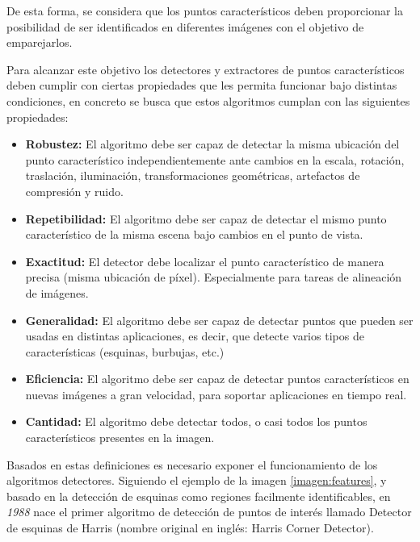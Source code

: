 De esta forma, se considera que los puntos característicos deben proporcionar la posibilidad de ser identificados en diferentes imágenes con el objetivo de emparejarlos.

Para alcanzar este objetivo los detectores y extractores de puntos característicos deben cumplir con ciertas propiedades que les permita funcionar bajo distintas condiciones, en concreto se busca que estos algoritmos cumplan con las siguientes propiedades:

\begin{itemize}
	\item \textbf{Robustez:} El algoritmo debe ser capaz de detectar la misma ubicación del punto característico independientemente ante cambios en la escala, rotación, traslación, iluminación, transformaciones geométricas, artefactos de compresión y ruido.
	
	\item \textbf{Repetibilidad:} El algoritmo debe ser capaz de detectar el mismo punto característico de la misma escena bajo cambios en el punto de vista.
	
	\item \textbf{Exactitud:} El detector debe localizar el punto característico de manera precisa (misma ubicación de píxel). Especialmente para tareas de alineación de imágenes.
	
	\item \textbf{Generalidad:} El algoritmo debe ser capaz de detectar puntos que pueden ser usadas en distintas aplicaciones, es decir, que detecte varios tipos de características (esquinas, burbujas, etc.)
	
	\item \textbf{Eficiencia:} El algoritmo debe ser capaz de detectar puntos característicos en nuevas imágenes a gran velocidad, para soportar aplicaciones en tiempo real.
	
	\item \textbf{Cantidad:} El algoritmo debe detectar todos, o casi todos los puntos característicos presentes en la imagen. 
	
\end{itemize}





Basados en estas definiciones es necesario exponer el funcionamiento de los algoritmos detectores.  Siguiendo el ejemplo de la imagen \ref{imagen:features}, y basado en la detección de esquinas como regiones facilmente identificables,  en \textit{1988} nace el primer algoritmo de detección de puntos de interés llamado Detector de esquinas de Harris \cite{harris} (nombre original en inglés: Harris Corner Detector).

